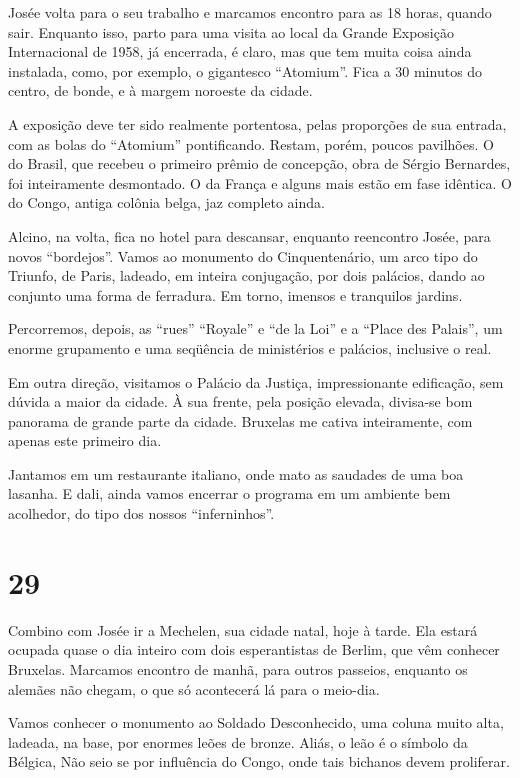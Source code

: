 Josée volta para o seu trabalho e marcamos encontro para as 18 horas, quando sair. Enquanto isso, parto para uma visita ao local da Grande Exposição Internacional de 1958, já encerrada, é claro, mas que tem muita coisa ainda instalada, como, por exemplo, o gigantesco “Atomium”. Fica a 30 minutos do centro, de bonde, e à margem noroeste da cidade.

A exposição deve ter sido realmente portentosa, pelas proporções de sua entrada, com as bolas do “Atomium” pontificando. Restam, porém, poucos pavilhões. O do Brasil, que recebeu o primeiro prêmio de concepção, obra de Sérgio Bernardes, foi inteiramente desmontado. O da França e alguns mais estão em fase idêntica. O do Congo, antiga colônia belga, jaz completo ainda.

Alcino, na volta, fica no hotel para descansar, enquanto reencontro Josée, para novos “bordejos”. Vamos ao monumento do Cinquentenário, um arco tipo do Triunfo, de Paris, ladeado, em inteira conjugação, por dois palácios, dando ao conjunto uma forma de ferradura. Em torno, imensos e tranquilos jardins.

Percorremos, depois, as “rues” “Royale” e “de la Loi” e a “Place des Palais”, um enorme grupamento e uma seqüência de ministérios e palácios, inclusive o real.

Em outra direção, visitamos o Palácio da Justiça, impressionante edificação, sem dúvida a maior da cidade. À sua frente, pela posição elevada, divisa-se bom panorama de grande parte da cidade. Bruxelas me cativa inteiramente, com apenas este primeiro dia.

Jantamos em um restaurante italiano, onde mato as saudades de uma boa lasanha. E dali, ainda vamos encerrar o programa em um ambiente bem acolhedor, do tipo dos nossos “inferninhos”.

\section*{29 \adfflatleafright {}}
Combino com Josée ir a Mechelen, sua cidade natal, hoje à tarde. Ela estará ocupada quase o dia inteiro com dois esperantistas de Berlim, que vêm conhecer Bruxelas. Marcamos encontro de manhã, para outros passeios, enquanto os alemães não chegam, o que só acontecerá lá para o meio-dia.

Vamos conhecer o monumento ao Soldado Desconhecido, uma coluna muito alta, ladeada, na base, por enormes leões de bronze. Aliás, o leão é o símbolo da Bélgica, Não seio se por influência do Congo, onde tais bichanos devem proliferar.

